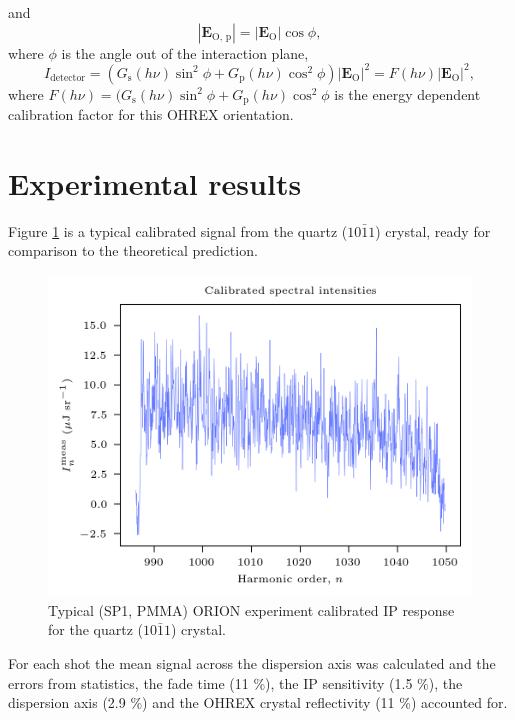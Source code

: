 and
\begin{equation}
	|\mathbf{E}_\mathrm{O,\, p}| = |\mathbf{E_\mathrm{O}}|\cos\phi,
\end{equation}
where $\phi$ is the angle out of the interaction plane,
\begin{equation}
	I_\mathrm{detector} = (G_\mathrm{s}(h\nu)\sin^2\phi + G_\mathrm{p}(h\nu)\cos^2\phi)|\mathbf{E_\mathrm{O}}|^2 = F(h\nu)|\mathbf{E_\mathrm{O}}|^2,
\end{equation}
where $F(h\nu) =  (G_\mathrm{s}(h\nu)\sin^2\phi + G_\mathrm{p}(h\nu)\cos^2\phi$ is the energy dependent calibration factor for this OHREX orientation.

\section{Experimental results}

Figure \ref{fig:orionq1011} is a typical calibrated signal from the quartz ($10\bar{1}1$) crystal, ready for comparison to the theoretical prediction.
\begin{figure}
	\centering
	\includegraphics[width=0.7\linewidth]{figures/orion/orion_q1011}
	\caption[Typical ORION experiment calibrated IP response for the quartz ($10\bar{1}1$) crystal.]{Typical (SP1, PMMA) ORION experiment calibrated IP response for the quartz ($10\bar{1}1$) crystal.}
	\label{fig:orionq1011}
\end{figure}
For each shot the mean signal across the dispersion axis was calculated and the errors from statistics, the fade time (11 \%), the IP sensitivity (1.5 \%), the dispersion axis (2.9 \%) and the OHREX crystal reflectivity (11 \%) accounted for.

